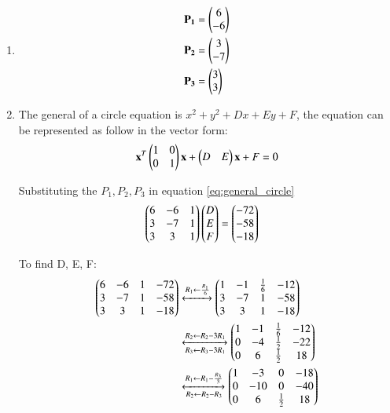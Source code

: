 \renewcommand{\theequation}{\theenumi}
\begin{enumerate}[label=\thesubsection.\arabic*.,ref=\thesubsection.\theenumi]
\item \begin{align}
\mathbf{P_1} &= \begin{pmatrix}6\\-6\end{pmatrix}\\
\mathbf{P_2} &= \begin{pmatrix}3\\-7\end{pmatrix}\\
\mathbf{P_3} &= \begin{pmatrix}3\\3\end{pmatrix}
\end{align}

\item The general of a circle equation is $x^2 + y^2 + Dx + Ey + F$, the equation can be represented as follow in the vector form:
\begin{align}
\mathbf{x}^T 
\begin{pmatrix}
1 & 0 \\
0 & 1
\end{pmatrix}
\mathbf{x} + 
\begin{pmatrix}
D & E 
\end{pmatrix}
\mathbf{x} + F = 0 \label{eq:general_circle}
\end{align}

Substituting the $P_1, P_2, P_3$ in equation \ref{eq:general_circle}
\begin{align}
\begin{pmatrix}
6 & -6 & 1\\
3 & -7 & 1\\
3 & 3 & 1\end{pmatrix}\begin{pmatrix}D\\E\\F\end{pmatrix} &= \begin{pmatrix}-72\\-58\\-18\end{pmatrix}
\end{align}   

To find D, E, F:
\begin{align}
\begin{pmatrix}6 & -6 & 1 & -72 \\
3 & -7 & 1 & -58 \\
3 & 3 & 1 & -18
\end{pmatrix}
&\xleftrightarrow[]{R_1 \leftarrow \frac{R_1}{6}}
\begin{pmatrix}1 & -1 & \frac{1}{6} & -12 \\
3 & -7 & 1 & -58 \\
3 & 3 & 1 & -18
\end{pmatrix}\\
&\xleftrightarrow[R_3 \leftarrow R_3 - 3R_1]{R_2 \leftarrow R_2 - 3R_1}
\begin{pmatrix}1 & -1 & \frac{1}{6} & -12 \\
0 & -4 & \frac{1}{2} & -22 \\
0 & 6 & \frac{1}{2} & 18
\end{pmatrix}\\
&\xleftrightarrow[R_2 \leftarrow R_2 - R_3]{R_1 \leftarrow R_1 - \frac{R_3}{3}}
\begin{pmatrix}1 & -3 & 0 & -18 \\
0 & -10 & 0 & -40 \\
0 & 6 & \frac{1}{2} & 18
\end{pmatrix}
\end{align}


\end{enumerate}
